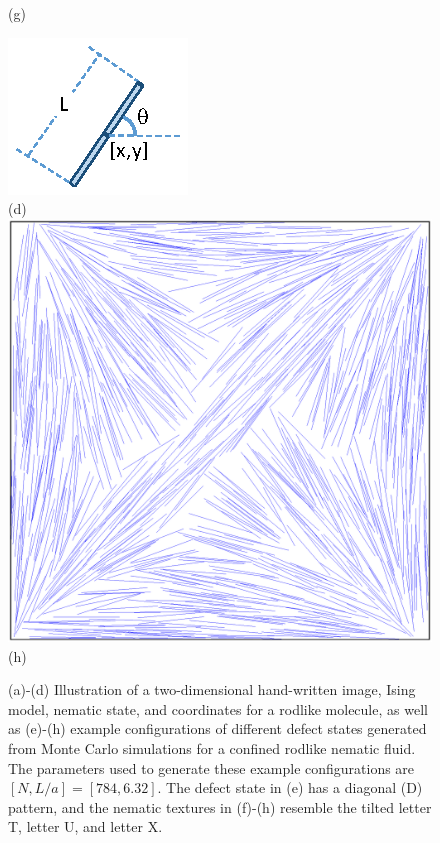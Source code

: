 \begin{figure}[!t]
\begin{minipage}[t]{0.25\textwidth}
		(g)
	\end{minipage}%
	\begin{minipage}[t]{0.25\textwidth}
		\centering
		\includegraphics[width=0.9\columnwidth]{./figs/FIG1D.eps}\\
		(d)\\ \vspace{0.5cm}
		\includegraphics[width=0.9\columnwidth]{./figs/FIG1H.eps}\\
		(h)
	\end{minipage}%
	\caption{(a)-(d) Illustration of a two-dimensional hand-written image, Ising model, nematic state, and coordinates for a rodlike molecule,
		as well as (e)-(h) example configurations of different defect states generated from
		Monte Carlo simulations for a
		confined rodlike nematic fluid.
		The parameters used to generate these example configurations are $[N,L/a]=[784,6.32]$.
		The defect state in (e) has a diagonal (D) pattern, and
		the nematic textures in (f)-(h) resemble the tilted letter T, letter U, and letter X. 
	}
	\label{FIG1}
\end{figure}

